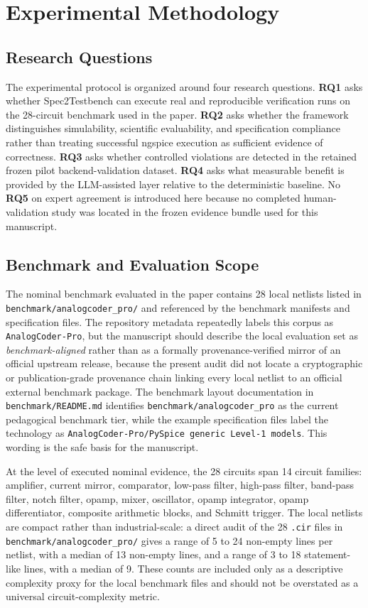 \section{Experimental Methodology}

\subsection{Research Questions}
The experimental protocol is organized around four research questions. \textbf{RQ1} asks whether Spec2Testbench can execute real and reproducible verification runs on the 28-circuit benchmark used in the paper. \textbf{RQ2} asks whether the framework distinguishes simulability, scientific evaluability, and specification compliance rather than treating successful ngspice execution as sufficient evidence of correctness. \textbf{RQ3} asks whether controlled violations are detected in the retained frozen pilot backend-validation dataset. \textbf{RQ4} asks what measurable benefit is provided by the LLM-assisted layer relative to the deterministic baseline. No \textbf{RQ5} on expert agreement is introduced here because no completed human-validation study was located in the frozen evidence bundle used for this manuscript.

\subsection{Benchmark and Evaluation Scope}
The nominal benchmark evaluated in the paper contains 28 local netlists listed in \texttt{benchmark/analogcoder\_pro/} and referenced by the benchmark manifests and specification files. The repository metadata repeatedly labels this corpus as \texttt{AnalogCoder-Pro}, but the manuscript should describe the local evaluation set as \emph{benchmark-aligned} rather than as a formally provenance-verified mirror of an official upstream release, because the present audit did not locate a cryptographic or publication-grade provenance chain linking every local netlist to an official external benchmark package. The benchmark layout documentation in \texttt{benchmark/README.md} identifies \texttt{benchmark/analogcoder\_pro} as the current pedagogical benchmark tier, while the example specification files label the technology as \texttt{AnalogCoder-Pro/PySpice generic Level-1 models}. This wording is the safe basis for the manuscript.

At the level of executed nominal evidence, the 28 circuits span 14 circuit families: amplifier, current mirror, comparator, low-pass filter, high-pass filter, band-pass filter, notch filter, opamp, mixer, oscillator, opamp integrator, opamp differentiator, composite arithmetic blocks, and Schmitt trigger. The local netlists are compact rather than industrial-scale: a direct audit of the 28 \texttt{.cir} files in \texttt{benchmark/analogcoder\_pro/} gives a range of 5 to 24 non-empty lines per netlist, with a median of 13 non-empty lines, and a range of 3 to 18 statement-like lines, with a median of 9. These counts are included only as a descriptive complexity proxy for the local benchmark files and should not be overstated as a universal circuit-complexity metric.

